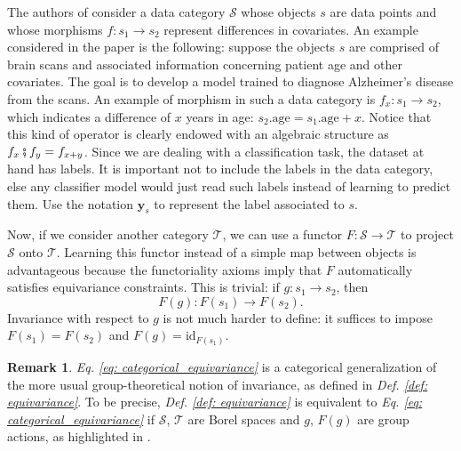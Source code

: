 \documentclass[11pt,a4paper,openright,twoside]{report}
\newcounter{mycounter}
\theoremstyle{plain}
\theoremstyle{definition}
\newtheorem{remark}[mycounter]{Remark}
\begin{document}
The authors of \cite{chytas2024poolingimagedatasetsmultiple} consider a data category $\mathcal{S}$ whose objects $s$ are data points and whose morphisms $f: s_1 \to s_2$ represent differences in covariates. An example considered in the paper is the following: suppose the objects $s$ are comprised of brain scans and associated information concerning patient age and other covariates. The goal is to develop a model trained to diagnose Alzheimer's disease from the scans. An example of morphism in such a data category is $f_x: s_1 \to s_2$, which indicates a difference of $x$ years in age: $s_2.\mathrm{age} = s_1.\mathrm{age} + x$. Notice that this kind of operator is clearly endowed with an algebraic structure as $f_x \fatsemi f_y = f_{x+y}$. Since we are dealing with a classification task, the dataset at hand has labels. It is important not to include the labels in the data category, else any classifier model would just read such labels instead of learning to predict them. Use the notation $\mathbf{y}_s$ to represent the label associated to $s$. 

Now, if we consider another category $\mathcal{T}$, we can use a functor $F: \mathcal{S} \to \mathcal{T}$ to project $\mathcal{S}$ onto $\mathcal{T}$. Learning this functor instead of a simple map between objects is advantageous because the functoriality axioms imply that $F$ automatically satisfies equivariance constraints. This is trivial: if $g: s_1 \to s_2$, then
\begin{equation}
  \label{eq: categorical_equivariance}
  F(g): F(s_1) \to F(s_2).
\end{equation}
Invariance with respect to $g$ is not much harder to define: it suffices to impose $F(s_1) = F(s_2)$ and $F(g) = \mathrm{id}_{F(s_1)}$.

\begin{remark}
  \textit{Eq. \ref{eq: categorical_equivariance}} is a categorical generalization of the more usual group-theoretical notion of invariance, as defined in \textit{Def. \ref{def: equivariance}}. To be precise, \textit{Def. \ref{def: equivariance}} is equivalent to \textit{Eq. \ref{eq: categorical_equivariance}} if $\mathcal{S}$, $\mathcal{T}$ are Borel spaces and $g$, $F(g)$ are group actions, as highlighted in \cite{chytas2024poolingimagedatasetsmultiple}.
\end{remark}
\end{document}
